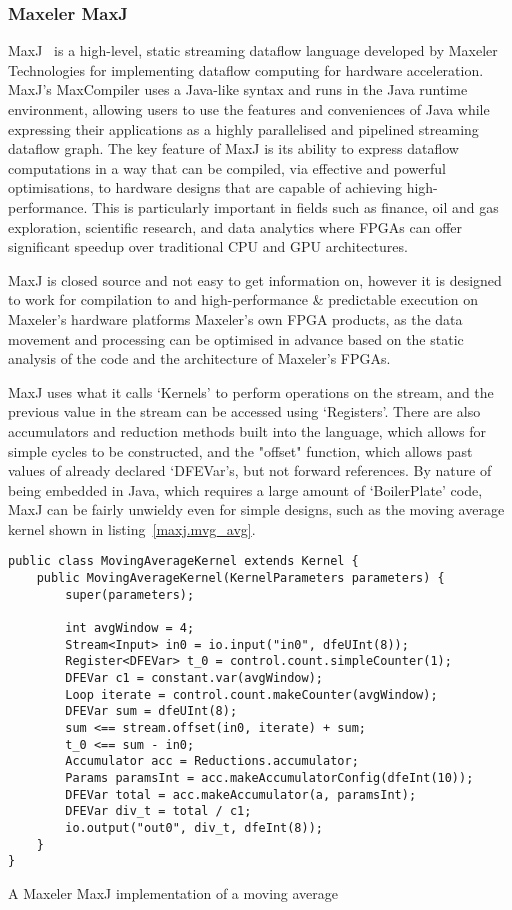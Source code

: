 \subsubsection{Maxeler MaxJ}
MaxJ \cite{maxj} is a high-level, static streaming dataflow language developed by Maxeler Technologies for implementing dataflow computing for hardware acceleration. MaxJ's MaxCompiler uses a Java-like syntax and runs in the Java runtime environment, allowing users to use the features and conveniences of Java while expressing their applications as a highly parallelised and pipelined streaming dataflow graph. The key feature of MaxJ is its ability to express dataflow computations in a way that can be compiled, via effective and powerful optimisations, to hardware designs that are capable of achieving high-performance. This is particularly important in fields such as finance, oil and gas exploration, scientific research, and data analytics where FPGAs can offer significant speedup over traditional CPU and GPU architectures.

MaxJ is closed source and not easy to get information on, however it is designed to work for compilation to and high-performance \& predictable execution on Maxeler's hardware platforms Maxeler's own FPGA products, as the data movement and processing can be optimised in advance based on the static analysis of the code and the architecture of Maxeler's FPGAs.

MaxJ uses what it calls `Kernels' to perform operations on the stream, and the previous value in the stream can be accessed using `Registers'. There are also accumulators and reduction methods built into the language, which allows for simple cycles to be constructed, and the "offset" function, which allows past values of already declared `DFEVar's, but not forward references. By nature of being embedded in Java, which requires a large amount of `BoilerPlate' code, MaxJ can be fairly unwieldy even for simple designs, such as the moving average kernel shown in listing \ref{maxj.mvg_avg}.

\renewcommand\theFancyVerbLine{\arabic{FancyVerbLine}}
\begin{listing}[H]
  \begin{verbatim}
public class MovingAverageKernel extends Kernel {
    public MovingAverageKernel(KernelParameters parameters) {
        super(parameters);

        int avgWindow = 4;
        Stream<Input> in0 = io.input("in0", dfeUInt(8));
        Register<DFEVar> t_0 = control.count.simpleCounter(1);
        DFEVar c1 = constant.var(avgWindow);
        Loop iterate = control.count.makeCounter(avgWindow);
        DFEVar sum = dfeUInt(8);
        sum <== stream.offset(in0, iterate) + sum;
        t_0 <== sum - in0;
        Accumulator acc = Reductions.accumulator;
        Params paramsInt = acc.makeAccumulatorConfig(dfeInt(10));
        DFEVar total = acc.makeAccumulator(a, paramsInt);
        DFEVar div_t = total / c1;
        io.output("out0", div_t, dfeInt(8));
    }
}
\end{verbatim}
  \caption{A Maxeler MaxJ implementation of a moving average}\label{maxj.mvg_avg}
\end{listing}


